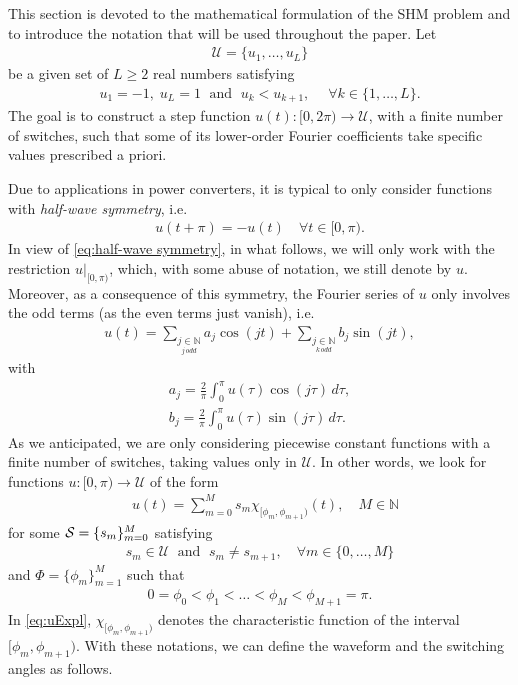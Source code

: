 \documentclass[twocolumn]{autart}    %
\begin{document}
This section is devoted to the mathematical formulation of the SHM problem and to introduce the notation that will be used throughout the paper. Let 
\begin{align}\label{eq:Udef}
	\mathcal{U} = \{u_1, \ldots, u_L\}
\end{align}
be a given set of $L\geq 2$ real numbers satisfying
\begin{align*}
	u_1 = -1, \; u_L = 1 \;\text{ and } \; u_k<u_{k+1}, \quad\; \forall k\in \{1,\ldots, L\}.
\end{align*}
The goal is to construct a step function $u(t):[0,2\pi)\to\mathcal U$, with a finite number of switches, such that some of its lower-order Fourier coefficients take specific values prescribed a priori.

Due to applications in power converters,  it is typical to only consider functions with \textit{half-wave symmetry}, i.e. 
\begin{align}\label{eq:half-wave symmetry}
	u(t + \pi) = -u(t)\quad \forall t \in [0,\pi).
\end{align}
In view of \eqref{eq:half-wave symmetry}, in what follows, we will only work with the restriction $u|_{[0,\pi)}$, which, with some abuse of notation, we still denote by $u$. Moreover, as a consequence of this symmetry, the Fourier series of $u$ only involves the odd terms (as the even terms just vanish), i.e.
\begin{align*}
	u(t) = \sum_{\underset{j\, odd}{j \in \mathbb{N}}} a_j \cos(jt)+ \sum_{\underset{k\, odd}{j \in \mathbb{N}}}  b_j \sin(jt),
\end{align*}
with
\begin{equation} \label{eq:an}
	\begin{aligned}
		a_j = \frac{2}{\pi} \int_0^\pi u(\tau ) \cos(j \tau)\,d\tau, 
		\\[5pt]
		b_j = \frac{2}{\pi} \int_0^\pi u(\tau)  \sin(j \tau)\,d\tau.
	\end{aligned}
\end{equation}
As we anticipated, we are only considering piecewise constant functions with a finite number of switches, taking values only in $\mathcal{U}$.
In other words, we look for functions $u: [0,\pi)\to \mathcal{U}$ of the form
\begin{align}\label{eq:uExpl}
	&u (t)= \sum_{m=0}^M s_m\chi_{[\phi_m,\phi_{m+1})} (t), \quad M\in\mathbb{N} 
\end{align}
for some $\mathcal{S} = \{ s_m\}_{m=0}^M$ satisfying
\begin{align*}
	s_m\in \mathcal{U} \; \text{ and } \; s_m\neq s_{m+1}, \quad \forall m\in \{0,\ldots, M\}
\end{align*}
and $\Phi = \{ \phi_m\}_{m=1}^{M}$ such that
\begin{align*}
	0= \phi_0 < \phi_1 <\ldots < \phi_M < \phi_{M+1} = \pi .
\end{align*}
In \eqref{eq:uExpl}, $\chi_{[\phi_m,\phi_{m+1})}$ denotes the characteristic function of the interval $[\phi_m,\phi_{m+1})$. With these notations, we can  define the waveform and the switching angles as follows.
\end{document}
